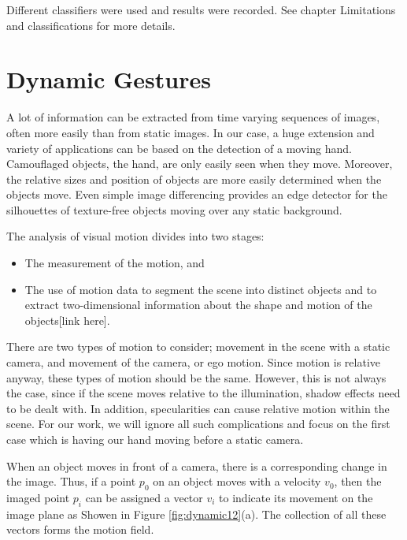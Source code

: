 \documentclass[12pt,fleqn]{book} %
\begin{document}
\bigskip
 
Different classifiers were used and results were recorded. See chapter Limitations and classifications for more details.
\bigskip



\section{Dynamic Gestures}
A lot of information can be extracted from time varying sequences of images, often more easily than from static images. In our case, a huge extension and variety of applications can be based on the detection of a moving hand. Camouflaged objects, the hand, are only easily seen when they move. Moreover, the relative sizes and position of objects are more easily determined when the objects move. Even simple image differencing provides an edge detector for the silhouettes of texture-free objects moving over any static background.\bigskip

The analysis of visual motion divides into two stages:
\begin{itemize}
\item The measurement of the motion, and 
\item The use of motion data to segment the scene into distinct objects and to extract two-dimensional information about the shape and motion of the objects[link here].
\end{itemize}
\bigskip

There are two types of motion to consider; movement in the scene with a static camera, and movement of the camera, or ego motion. Since motion is relative anyway, these types of motion should be the same. However, this is not always the case, since if the scene moves relative to the illumination, shadow effects need to be dealt with. In addition, specularities can cause relative motion within the scene. For our work, we will ignore all such complications and focus on the first case which is having our hand moving before a static camera.\bigskip

When an object moves in front of a camera, there is a corresponding change in the image. Thus, if a point $p_0$ on an object moves with a velocity $v_0$, then the imaged point $p_i$ can be assigned a vector $v_i$ to indicate its movement on the image plane as Showen in Figure \ref{fig:dynamic12}(a). The collection of all these vectors forms the motion field.
\end{document}
